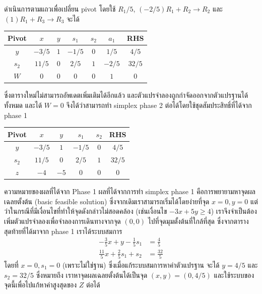 \begin{solution}
\begin{enumerate}[label=\textbf{ขั้นที่ \arabic*:}, align=left, labelwidth=5em, labelsep=1em, leftmargin=*, itemsep=16pt, topsep=0pt, parsep=0pt, partopsep=0pt]
    ดำเนินการตามแถวเพื่อเปลี่ยน pivot โดยใช้ $R_1/5$, $(-2/5)R_1 + R_2 \rightarrow R_2 $ และ $(1)R_1 + R_3 \rightarrow R_3 $ จะได้
    \begin{center}
        \begin{tabular}{|c|ccccc|c|}
            \hline
            \textbf{Pivot} & $x$ & $y$ &  $s_1$ & $s_2$ & $a_1$ &  \textbf{RHS}  \\
            \hline
            $y$ & $-3/5$ & $1$  & $-1/5$ & $0$ & $1/5$ & $4/5$ \\
            $s_2$ & $11/5$ & $0$  & $2/5$ & $1$ & $-2/5$ & $32/5$ \\
            \hline
            $W$   & $0$ & $0$  & $0$ & $0$ & $1$ & $0$ \\
            \hline
        \end{tabular}
    \end{center}
    ซึ่งตารางใหม่ไม่สามารถอัพเดตเพิ่มเติมได้อีกแล้ว และตัวแปรจำลองถูกกำจัดออกจากตัวแปรฐานได้ทั้งหมด และได้ $W=0$ จึงได้ว่าสามารถทำ simplex phase 2 ต่อได้โดยใช้ชุดสัมประสิทธิ์ที่ได้จาก phase 1
    \begin{center}
        \begin{tabular}{|c|cccc|c|}
            \hline
            \textbf{Pivot} & $x$ & $y$ &  $s_1$ & $s_2$ &  \textbf{RHS}  \\
            \hline
            $y$ & $-3/5$ & $1$  & $-1/5$ & $0$ & $4/5$ \\
            $s_2$ & $11/5$ & $0$  & $2/5$ & $1$ & $32/5$ \\
            \hline
            $z$   & $-4$ & $-5$  & $0$ & $0$ & $0$ \\
            \hline
        \end{tabular}
    \end{center}

    \begin{remark}{ความหมายของผลที่ได้จาก Phase 1}{}
        ผลที่ได้จากการทำ simplex phase 1 คือการพยายามหาจุดผลเฉลยตั้งต้น (basic feasible solution) ซึ่งจากเดิมเราสามารถเริ่มได้โดยง่ายที่จุด $x=0, y=0$ แต่ว่าในกรณีที่มีเงื่อนไขที่ทำให้จุดดังกล่าวไม่สอดคล้อง (เช่นเงื่อนไข $-3x + 5y \geq 4$) เราจึงจำเป็นต้องเพิ่มตัวแปรจำลองเพื่อจำลองการเดินทางจากจุด $(0,0)$ ไปที่จุดมุมตั้งต้นที่ใกล้ที่สุด ซึ่งจากตารางสุดท้ายที่ได้มาจาก phase 1 เราได้ระบบสมการ
        \begin{align*}
            -\frac{3}{5}x + y - \frac{1}{5}s_1 &= \frac{4}{5}\\
            \frac{11}{5}x + \frac{2}{5}s_1 + s_2 &= \frac{32}{5}
        \end{align*}
        โดยที่ $x = 0, s_1=0$ (เพราะไม่ใช่ฐาน) ซึ่งเมื่อแก้ระบบสมการหาค่าตัวแปรฐาน จะได้ $y=4/5$ และ $s_2 = 32/5$ ซึ่งหมายถึง เราหาจุดผลเฉลยตั้งต้นได้เป็นจุด $(x,y) = (0, 4/5)$ และใช้ระบบของจุดนี้เพื่อไปแก้หาค่าสูงสุดของ $Z$ ต่อได้
    \end{remark}
    

\end{enumerate}
\end{solution}
